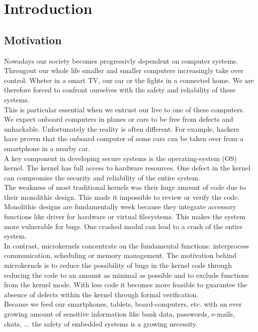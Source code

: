\section{Introduction}
	\subsection{Motivation}
Nowadays our society becomes progressivly dependent on computer systems. Througout our whole life smaller and smaller computers increasingly take over control. Wheter in a smart TV, our car or the lights in a connected home. We are therefore forced to confront ourselves with the safety and reliability of these systems. \\
This is particular essential when we entrust our live to one of these computers. We expect onboard computers in planes or cars to be free from defects and unhackable. Unfortunately the reality is often different. For example, hackers have proven that the onboard computer of some cars can be taken over from a smartphone in a nearby car. \\
A key component in developing secure systems is the operating-system (OS) kernel. The kernel has full access to hardware resources. One defect in the kernel can compromise the security and reliability of the entire system. \\
The weakness of most traditional kernels was their huge amount of code due to their monolithic design. This made it impossible to review or verify the code. Monolithic designs are fundamentally week because they integrate accessory functions like driver for hardware or virtual filesystems. This makes the system more vulnerable for bugs. One crashed modul can lead to a crash of the entire system. \\
In contrast, microkernels concentrate on the fundamental functions: interprocess communication, scheduling or memory management. The motivation behind microkernels is to reduce the  possibility of bugs in the kernel code through reducing the code to an amount as minimal as possible and to exclude functions from the kernel mode. With less code it becomes more feasible to guarantee the absence of defects within the kernel through formal verification.\\
Because we feed our smartphones, tablets, board-computers, etc. with an ever growing amount of sensitive information like bank data, passwords, e-mails, chats, ... the safety of embedded systems is a growing necessity. \\
